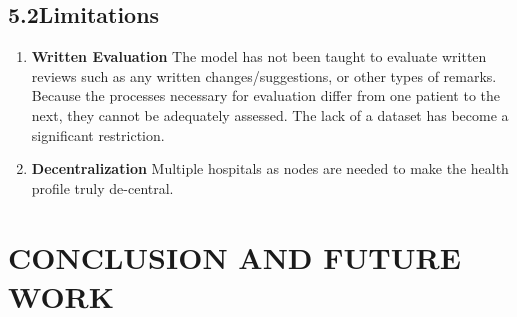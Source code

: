 \documentclass[oneside,a4paper,12pt]{book}
\begin{document}
\section*{5.2\hspace*{10pt}Limitations}
\begin{enumerate}
	\item \textbf {Written Evaluation }The model has not been taught to evaluate written reviews such as any written changes/suggestions, or other types of remarks. Because the processes necessary for evaluation differ from one patient to the next, they cannot be adequately assessed. The lack of a dataset has become a significant restriction.\par

	\item \textbf {Decentralization} Multiple hospitals as nodes are needed to make the health profile truly de-central.
	\par

\end{enumerate}\par


\vspace{\baselineskip}



\newpage

\vspace{\baselineskip}
\vspace{\baselineskip}

\vspace{\baselineskip}

\vspace{\baselineskip}

\vspace{\baselineskip}

\vspace{\baselineskip}

\vspace{\baselineskip}

\vspace{\baselineskip}

\vspace{\baselineskip}
\chapter{CONCLUSION AND FUTURE WORK}\par
\end{document}
